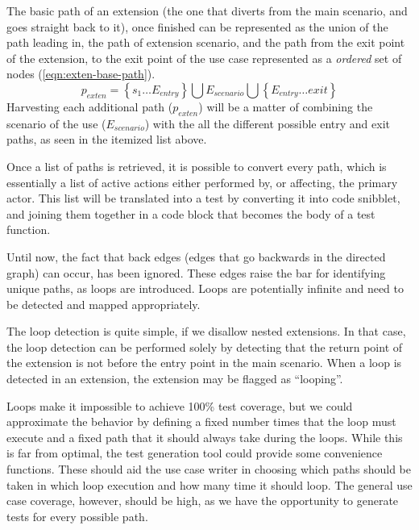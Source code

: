 \noindent The basic path of an extension (the one that diverts from the main scenario, and goes straight back to it), once finished can be represented as the union of the path leading in, the path of extension scenario, and the path from the exit point of the extension, to the exit point of the use case represented as a \emph{ordered} set of nodes (\ref{eqn:exten-base-path}). 
\begin{equation}
p_{exten} = \left\lbrace s_1 \dots E_{entry} \right\rbrace \bigcup E_{scenario} \bigcup \left\lbrace E_{entry} \dots exit \right\rbrace
\label{eqn:exten-base-path}
\end{equation}
\noindent Harvesting each additional path ($p_{exten}$) will be a matter of combining the scenario of the use ($E_{scenario}$) with the all the different possible entry and exit paths, as seen in the itemized list above.\medskip

\noindent Once a list of paths is retrieved, it is possible to convert every path, which is essentially a list of active actions either performed by, or affecting, the primary actor. This list will be translated into a test by converting it into code snibblet, and joining them together in a code block that becomes the body of a test function.\medskip

\noindent Until now, the fact that back edges (edges that go backwards in the directed graph) can occur, has been ignored. These edges raise the bar for identifying unique paths, as loops are introduced. Loops are potentially infinite and need to be detected and mapped appropriately.\medskip

\noindent The loop detection is quite simple, if we disallow nested extensions. In that case, the loop detection can be performed solely by detecting that the return point of the extension is not before the entry point in the main scenario. When a loop is detected in an extension, the extension may be flagged as ``looping''.\medskip

\noindent Loops make it impossible to achieve 100\% test coverage, but we could approximate the behavior by defining a fixed number times that the loop must execute and a fixed path that it should always take during the loops. While this is far from optimal, the test generation tool could provide some convenience functions. These should aid the use case writer in choosing which paths should be taken in which loop execution and how many time it should loop. The general use case coverage, however, should be high, as we have the opportunity to generate tests for every possible path.

